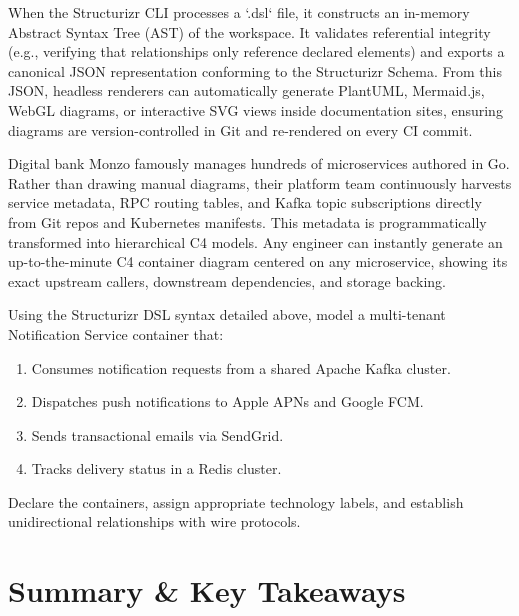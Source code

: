 \begin{underthehoodbox}
When the Structurizr CLI processes a `.dsl` file, it constructs an in-memory Abstract Syntax Tree (AST) of the workspace. It validates referential integrity (e.g., verifying that relationships only reference declared elements) and exports a canonical JSON representation conforming to the Structurizr Schema. From this JSON, headless renderers can automatically generate PlantUML, Mermaid.js, WebGL diagrams, or interactive SVG views inside documentation sites, ensuring diagrams are version-controlled in Git and re-rendered on every CI commit.
\end{underthehoodbox}

\begin{realworldbox}
Digital bank Monzo famously manages hundreds of microservices authored in Go. Rather than drawing manual diagrams, their platform team continuously harvests service metadata, RPC routing tables, and Kafka topic subscriptions directly from Git repos and Kubernetes manifests. This metadata is programmatically transformed into hierarchical C4 models. Any engineer can instantly generate an up-to-the-minute C4 container diagram centered on any microservice, showing its exact upstream callers, downstream dependencies, and storage backing.
\end{realworldbox}

\begin{tryityourselfbox}
Using the Structurizr DSL syntax detailed above, model a multi-tenant Notification Service container that:
\begin{enumerate}
  \item Consumes notification requests from a shared Apache Kafka cluster.
  \item Dispatches push notifications to Apple APNs and Google FCM.
  \item Sends transactional emails via SendGrid.
  \item Tracks delivery status in a Redis cluster.
\end{enumerate}
Declare the containers, assign appropriate technology labels, and establish unidirectional relationships with wire protocols.
\end{tryityourselfbox}

\section{Summary \protect\& Key Takeaways}

